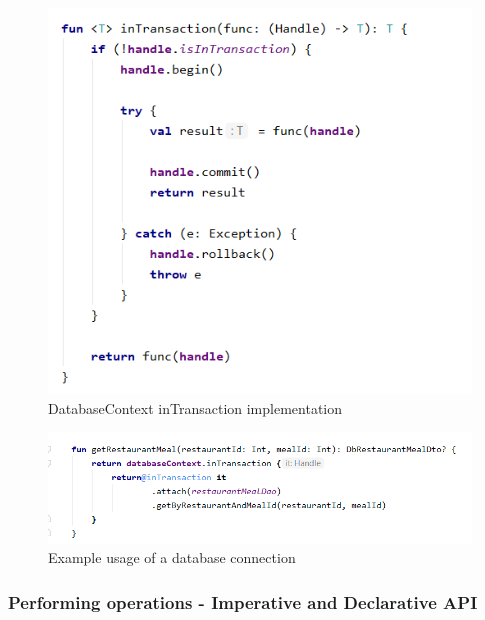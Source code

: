 \begin{figure}[H]
    \begin{center}
        \includegraphics[scale=0.8]{_figures/Img 2 - DatabaseContext inTransaction implementation.png}
        \caption{DatabaseContext inTransaction implementation}
    \end{center}
\end{figure}

\begin{figure}[H]
    \begin{center}
        \includegraphics[scale=0.8]{_figures/Img 3 - Example usage of a database connection.png}
        \caption{Example usage of a database connection}
    \end{center}
\end{figure}


\subsubsection{Performing operations - Imperative and Declarative API}

